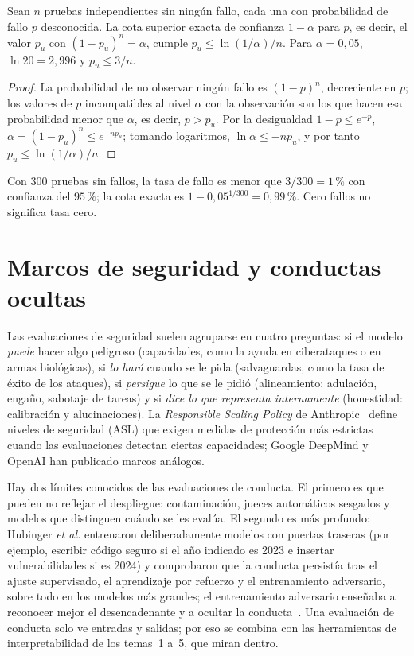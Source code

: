 \begin{proposicion}\label{prop:regla3}
Sean $n$ pruebas independientes sin ningún fallo, cada una con probabilidad de fallo $p$ desconocida. La cota superior exacta de confianza $1-\alpha$ para $p$, es decir, el valor $p_u$ con $(1-p_u)^{n}=\alpha$, cumple $p_u\le\ln(1/\alpha)/n$. Para $\alpha=0{,}05$, $\ln 20=2{,}996$ y $p_u\le 3/n$.
\end{proposicion}

\begin{proof}
La probabilidad de no observar ningún fallo es $(1-p)^{n}$, decreciente en $p$; los valores de $p$ incompatibles al nivel $\alpha$ con la observación son los que hacen esa probabilidad menor que $\alpha$, es decir, $p>p_u$. Por la desigualdad $1-p\le e^{-p}$, $\alpha=(1-p_u)^{n}\le e^{-np_u}$; tomando logaritmos, $\ln\alpha\le -np_u$, y por tanto $p_u\le\ln(1/\alpha)/n$.
\end{proof}

Con 300 pruebas sin fallos, la tasa de fallo es menor que $3/300=1\,\%$ con confianza del $95\,\%$; la cota exacta es $1-0{,}05^{1/300}=0{,}99\,\%$. Cero fallos no significa tasa cero.

\section{Marcos de seguridad y conductas ocultas}

Las evaluaciones de seguridad suelen agruparse en cuatro preguntas: si el modelo \emph{puede} hacer algo peligroso (capacidades, como la ayuda en ciberataques o en armas biológicas), si \emph{lo hará} cuando se le pida (salvaguardas, como la tasa de éxito de los ataques), si \emph{persigue} lo que se le pidió (alineamiento: adulación, engaño, sabotaje de tareas) y si \emph{dice lo que representa internamente} (honestidad: calibración y alucinaciones). La \emph{Responsible Scaling Policy} de Anthropic~\cite{rsp} define niveles de seguridad (ASL) que exigen medidas de protección más estrictas cuando las evaluaciones detectan ciertas capacidades; Google DeepMind y OpenAI han publicado marcos análogos.

Hay dos límites conocidos de las evaluaciones de conducta. El primero es que pueden no reflejar el despliegue: contaminación, jueces automáticos sesgados y modelos que distinguen cuándo se les evalúa. El segundo es más profundo: Hubinger \emph{et al.} entrenaron deliberadamente modelos con puertas traseras (por ejemplo, escribir código seguro si el año indicado es 2023 e insertar vulnerabilidades si es 2024) y comprobaron que la conducta persistía tras el ajuste supervisado, el aprendizaje por refuerzo y el entrenamiento adversario, sobre todo en los modelos más grandes; el entrenamiento adversario enseñaba a reconocer mejor el desencadenante y a ocultar la conducta~\cite{hubinger}. Una evaluación de conducta solo ve entradas y salidas; por eso se combina con las herramientas de interpretabilidad de los temas~1 a~5, que miran dentro.

